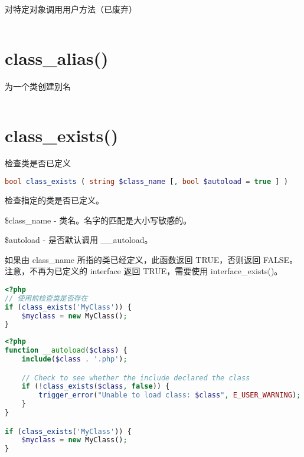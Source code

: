 对特定对象调用用户方法（已废弃）


\begin{lstlisting}[language=PHP]

\end{lstlisting}


\section{class\_alias()}
为一个类创建别名


\begin{lstlisting}[language=PHP]

\end{lstlisting}


\section{class\_exists()}
检查类是否已定义



\begin{lstlisting}[language=PHP]
bool class_exists ( string $class_name [, bool $autoload = true ] )
\end{lstlisting}


检查指定的类是否已定义。

\begin{compactitem}
\item \$class\_name - 类名。名字的匹配是大小写敏感的。
\item \$autoload - 是否默认调用 \_\_autoload。
\end{compactitem}

如果由 class\_name 所指的类已经定义，此函数返回 TRUE，否则返回 FALSE。注意，不再为已定义的 interface 返回 TRUE，需要使用 interface\_exists()。

\begin{lstlisting}[language=PHP]
<?php
// 使用前检查类是否存在
if (class_exists('MyClass')) {
    $myclass = new MyClass();
}
\end{lstlisting}




\begin{lstlisting}[language=PHP]
<?php
function __autoload($class) {
    include($class . '.php');

    // Check to see whether the include declared the class
    if (!class_exists($class, false)) {
        trigger_error("Unable to load class: $class", E_USER_WARNING);
    }
}

if (class_exists('MyClass')) {
    $myclass = new MyClass();
}
\end{lstlisting}



